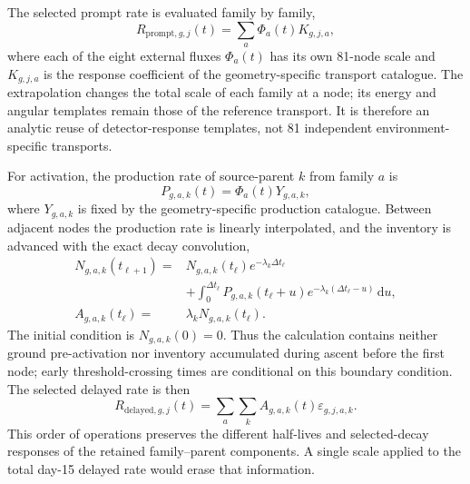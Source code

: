 \documentclass[11pt]{article}
\begin{document}
The selected prompt rate is evaluated family by family,
\begin{equation}
 R_{\mathrm{prompt},g,j}(t)=\sum_a\Phi_a(t)K_{g,j,a},
 \label{eq:prompt_source_response}
\end{equation}
where each of the eight external fluxes $\Phi_a(t)$ has its own 81-node scale
and $K_{g,j,a}$ is the response coefficient of the geometry-specific transport
catalogue. The extrapolation changes the total scale of each family at a node;
its energy and angular templates remain those of the reference transport. It is
therefore an analytic reuse of detector-response templates, not 81 independent
environment-specific transports.

For activation, the production rate of source-parent $k$ from family $a$ is
\begin{equation}
 P_{g,a,k}(t)=\Phi_a(t)Y_{g,a,k},
 \label{eq:activation_production}
\end{equation}
where $Y_{g,a,k}$ is fixed by the geometry-specific production catalogue. Between
adjacent nodes the production rate is linearly interpolated, and the inventory
is advanced with the exact decay convolution,
\begin{equation}
 \begin{aligned}
 N_{g,a,k}(t_{\ell+1})={}&N_{g,a,k}(t_\ell)e^{-\lambda_k\Delta t_\ell}\\
 &+\int_0^{\Delta t_\ell}P_{g,a,k}(t_\ell+u)
 e^{-\lambda_k(\Delta t_\ell-u)}\,\mathrm du,\\
 A_{g,a,k}(t_\ell)={}&\lambda_kN_{g,a,k}(t_\ell).
 \end{aligned}
 \label{eq:delayed_inventory}
\end{equation}
The initial condition is $N_{g,a,k}(0)=0$. Thus the calculation contains neither
ground pre-activation nor inventory accumulated during ascent before the first
node; early threshold-crossing times are conditional on this boundary condition.
The selected delayed rate is then
\begin{equation}
 R_{\mathrm{delayed},g,j}(t)=
 \sum_a\sum_k A_{g,a,k}(t)\varepsilon_{g,j,a,k}.
 \label{eq:delayed_selected}
\end{equation}
This order of operations preserves the different half-lives and selected-decay
responses of the retained family--parent components. A single scale applied to
the total day-15 delayed rate would erase that information.
\end{document}
